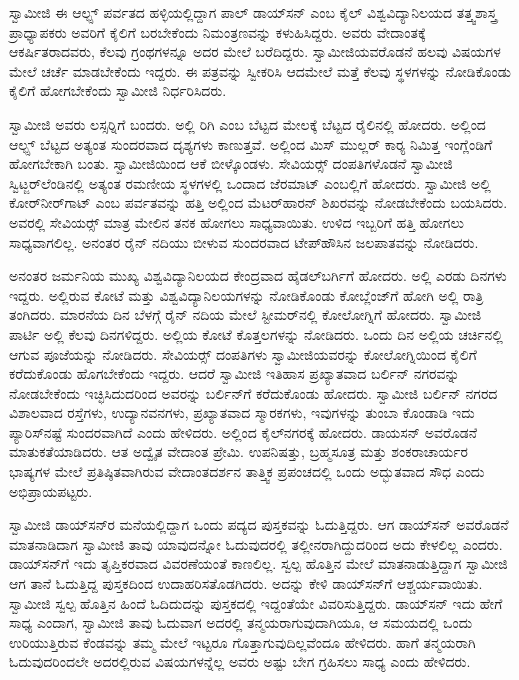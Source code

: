 \newpage

 ಸ್ವಾಮೀಜಿ ಈ ಆಲ್ಫ್ಸ್ ಪರ್ವತದ ಹಳ್ಳಿಯಲ್ಲಿದ್ದಾಗ ಪಾಲ್ ಡಾಯ್‍ಸನ್ ಎಂಬ ಕೈಲ್ ವಿಶ್ವವಿದ್ಯಾನಿಲಯದ ತತ್ತ್ವಶಾಸ್ತ್ರ ಪ್ರಾಧ್ಯಾಪಕರು ಅವರಿಗೆ ಕೈಲಿಗೆ ಬರಬೇಕೆಂದು ನಿಮಂತ್ರಣವನ್ನು ಕಳುಹಿಸಿದ್ದರು. ಅವರು ವೇದಾಂತಕ್ಕೆ ಆಕರ್ಷಿತರಾದವರು, ಕೆಲವು ಗ್ರಂಥಗಳನ್ನೂ ಅದರ ಮೇಲೆ ಬರೆದಿದ್ದರು. ಸ್ವಾಮೀಜಿಯವರೊಡನೆ ಹಲವು ವಿಷಯಗಳ ಮೇಲೆ ಚರ್ಚೆ ಮಾಡಬೇಕೆಂದು ಇದ್ದರು. ಈ ಪತ್ರವನ್ನು ಸ್ವೀಕರಿಸಿ ಆದಮೇಲೆ ಮತ್ತೆ ಕೆಲವು ಸ್ಥಳಗಳನ್ನು ನೋಡಿಕೊಂಡು ಕೈಲಿಗೆ ಹೋಗಬೇಕೆಂದು ಸ್ವಾಮೀಜಿ ನಿರ್ಧರಿಸಿದರು. 

 ಸ್ವಾಮೀಜಿ ಅವರು ಲಸ್ಸರ‍್ನಿಗೆ ಬಂದರು. ಅಲ್ಲಿ ರಿಗಿ ಎಂಬ ಬೆಟ್ಟದ ಮೇಲಕ್ಕೆ ಬೆಟ್ಟದ ರೈಲಿನಲ್ಲಿ ಹೋದರು. ಅಲ್ಲಿಂದ ಆಲ್ಫ್ಸ್ ಬೆಟ್ಟದ ಅತ್ಯಂತ ಸುಂದರವಾದ ದೃಶ್ಯಗಳು ಕಾಣುತ್ತವೆ. ಅಲ್ಲಿಂದ ಮಿಸ್ ಮುಲ್ಲರ್ ಕಾರ‍್ಯ ನಿಮಿತ್ತ ಇಂಗ್ಲೆಂಡಿಗೆ ಹೋಗಬೇಕಾಗಿ ಬಂತು. ಸ್ವಾಮೀಜಿಯಿಂದ ಆಕೆ ಬೀಳ್ಕೊಂಡಳು. ಸೇವಿಯರ್ಸ್‍‍ ದಂಪತಿಗಳೊಡನೆ ಸ್ವಾಮೀಜಿ ಸ್ವಿಟ್ಜರ್‌ಲೆಂಡಿನಲ್ಲಿ ಅತ್ಯಂತ ರಮಣೀಯ ಸ್ಥಳಗಳಲ್ಲಿ ಒಂದಾದ ಜೆರಮಾಟ್ ಎಂಬಲ್ಲಿಗೆ ಹೋದರು. ಸ್ವಾಮೀಜಿ ಅಲ್ಲಿ ಕೋರ್‌ನೀರ್‌ಗಾಟ್ ಎಂಬ ಪರ್ವತವನ್ನು ಹತ್ತಿ ಅಲ್ಲಿಂದ ಮೆಟರ್‌ಹಾರನ್ ಶಿಖರವನ್ನು ನೋಡಬೇಕೆಂದು ಬಯಸಿದರು. ಅವರಲ್ಲಿ ಸೇವಿಯರ್ಸ್‍‍ ಮಾತ್ರ ಮೇಲಿನ ತನಕ ಹೋಗಲು ಸಾಧ್ಯವಾಯಿತು. ಉಳಿದ ಇಬ್ಬರಿಗೆ ಹತ್ತಿ ಹೋಗಲು ಸಾಧ್ಯವಾಗಲಿಲ್ಲ. ಅನಂತರ ರೈನ್ ನದಿಯು ಬೀಳುವ ಸುಂದರವಾದ ಟೇಪ್‍ಹೌಸಿನ ಜಲಪಾತವನ್ನು ನೋಡಿದರು. 

 ಅನಂತರ ಜರ್ಮನಿಯ ಮುಖ್ಯ ವಿಶ್ವವಿದ್ಯಾನಿಲಯದ ಕೇಂದ್ರವಾದ ಹೈಡಲ್‍ಬರ್ಗಿಗೆ ಹೋದರು. ಅಲ್ಲಿ ಎರಡು ದಿನಗಳು ಇದ್ದರು. ಅಲ್ಲಿರುವ ಕೋಟೆ ಮತ್ತು ವಿಶ್ವವಿದ್ಯಾನಿಲಯಗಳನ್ನು ನೋಡಿಕೊಂಡು ಕೋಬ್ಲೆಂಜ್‍ಗೆ ಹೋಗಿ ಅಲ್ಲಿ ರಾತ್ರಿ ತಂಗಿದರು. ಮಾರನೆಯ ದಿನ ಬೆಳಗ್ಗೆ ರೈನ್ ನದಿಯ ಮೇಲೆ ಸ್ಟೀಮರ್‌ನಲ್ಲಿ ಕೋಲೋಗ್ನಿಗೆ ಹೋದರು. ಸ್ವಾಮೀಜಿ ಪಾರ್ಟಿ ಅಲ್ಲಿ ಕೆಲವು ದಿನಗಳಿದ್ದರು. ಅಲ್ಲಿಯ ಕೋಟೆ ಕೊತ್ತಲಗಳನ್ನು ನೋಡಿದರು. ಒಂದು ದಿನ ಅಲ್ಲಿಯ ಚರ್ಚಿನಲ್ಲಿ ಆಗುವ ಪೂಜೆಯನ್ನು ನೋಡಿದರು. ಸೇವಿಯರ್ಸ್‍‍ ದಂಪತಿಗಳು ಸ್ವಾಮೀಜಿಯವರನ್ನು ಕೋಲೋಗ್ನಿಯಿಂದ ಕೈಲಿಗೆ ಕರೆದುಕೊಂಡು ಹೊಗಬೇಕೆಂದು ಇದ್ದರು. ಆದರೆ ಸ್ವಾಮೀಜಿ ಇತಿಹಾಸ ಪ್ರಖ್ಯಾತವಾದ ಬರ್ಲಿನ್ ನಗರವನ್ನು ನೋಡಬೇಕೆಂದು ಇಚ್ಛಿಸಿದುದರಿಂದ ಅವರನ್ನು ಬರ್ಲಿನ್‍ಗೆ ಕರೆದುಕೊಂಡು ಹೋದರು. ಸ್ವಾಮೀಜಿ ಬರ್ಲಿನ್ ನಗರದ ವಿಶಾಲವಾದ ರಸ್ತೆಗಳು, ಉದ್ಯಾನವನಗಳು, ಪ್ರಖ್ಯಾತವಾದ ಸ್ಮಾರಕಗಳು, ಇವುಗಳನ್ನು ತುಂಬಾ ಕೊಂಡಾಡಿ ಇದು ಪ್ಯಾರಿಸ್‍ನಷ್ಟೆ ಸುಂದರವಾಗಿದೆ ಎಂದು ಹೇಳಿದರು. ಅಲ್ಲಿಂದ ಕೈಲ್‍ನಗರಕ್ಕೆ ಹೋದರು. ಡಾಯಸನ್ ಅವರೊಡನೆ ಮಾತುಕತೆಯಾಡಿದರು. ಆತ ಅದ್ವೈತ ವೇದಾಂತ ಪ್ರೇಮಿ. ಉಪನಿಷತ್ತು, ಬ್ರಹ್ಮಸೂತ್ರ ಮತ್ತು ಶಂಕರಾಚಾರ್ಯರ ಭಾಷ್ಯಗಳ ಮೇಲೆ ಪ್ರತಿಷ್ಠಿತವಾಗಿರುವ ವೇದಾಂತದರ್ಶನ ತಾತ್ತ್ವಿಕ ಪ್ರಪಂಚದಲ್ಲಿ ಒಂದು ಅದ್ಭುತವಾದ ಸೌಧ ಎಂದು ಅಭಿಪ್ರಾಯಪಟ್ಟರು. 

 ಸ್ವಾಮೀಜಿ ಡಾಯ್‍ಸನ್‍ರ ಮನೆಯಲ್ಲಿದ್ದಾಗ ಒಂದು ಪದ್ಯದ ಪುಸ್ತಕವನ್ನು ಓದುತ್ತಿದ್ದರು. ಆಗ ಡಾಯ್‍ಸನ್‍ ಅವರೊಡನೆ ಮಾತನಾಡಿದಾಗ ಸ್ವಾಮೀಜಿ ತಾವು ಯಾವುದನ್ನೋ ಓದುವುದರಲ್ಲಿ ತಲ್ಲೀನರಾಗಿದ್ದುದರಿಂದ ಅದು ಕೇಳಲಿಲ್ಲ ಎಂದರು. ಡಾಯ್‍ಸನ್‍ಗೆ ಇದು ತೃಪ್ತಿಕರವಾದ ವಿವರಣೆಯಂತೆ ಕಾಣಲಿಲ್ಲ. ಸ್ವಲ್ಪ ಹೊತ್ತಿನ ಮೇಲೆ ಮಾತನಾಡುತ್ತಿದ್ದಾಗ ಸ್ವಾಮೀಜಿ ಆಗ ತಾನೆ ಓದುತ್ತಿದ್ದ ಪುಸ್ತಕದಿಂದ ಉದಾಹರಿಸತೊಡಗಿದರು. ಅದನ್ನು ಕೇಳಿ ಡಾಯ್‍ಸನ್‍ಗೆ ಆಶ್ಚರ್ಯವಾಯಿತು. ಸ್ವಾಮೀಜಿ ಸ್ವಲ್ಪ ಹೊತ್ತಿನ ಹಿಂದೆ ಓದಿದುದನ್ನು ಪುಸ್ತಕದಲ್ಲಿ ಇದ್ದಂತೆಯೇ ವಿವರಿಸುತ್ತಿದ್ದರು. ಡಾಯ್‍ಸನ್‍ ಇದು ಹೇಗೆ ಸಾಧ್ಯ ಎಂದಾಗ, ಸ್ವಾಮೀಜಿ ತಾವು ಓದುವಾಗ ಅದರಲ್ಲಿ ತನ್ಮಯರಾಗುವುದಾಗಿಯೂ, ಆ ಸಮಯದಲ್ಲಿ ಒಂದು ಉರಿಯುತ್ತಿರುವ ಕೆಂಡವನ್ನು ತಮ್ಮ ಮೇಲೆ ಇಟ್ಟರೂ ಗೊತ್ತಾಗುವುದಿಲ್ಲವೆಂದೂ ಹೇಳಿದರು. ಹಾಗೆ ತನ್ಮಯರಾಗಿ ಓದುವುದರಿಂದಲೇ ಅದರಲ್ಲಿರುವ ವಿಷಯಗಳನ್ನೆಲ್ಲ ಅವರು ಅಷ್ಟು ಬೇಗ ಗ್ರಹಿಸಲು ಸಾಧ್ಯ ಎಂದು ಹೇಳಿದರು. 

